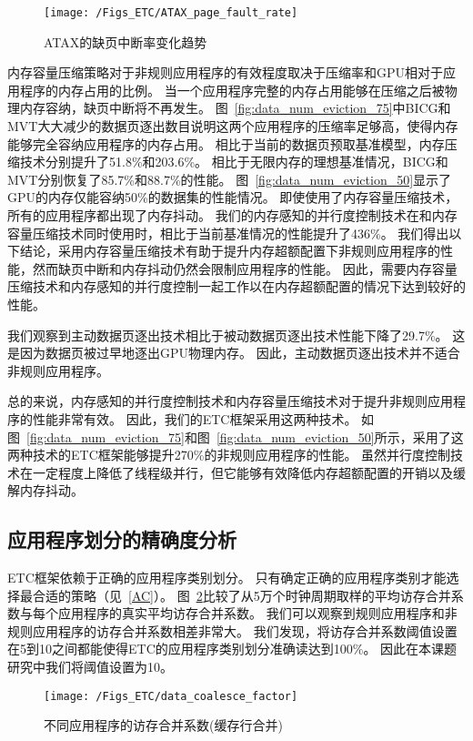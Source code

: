 \begin{figure}[htbp] %
  \centering
  \texttt{[image: /Figs\_ETC/ATAX\_page\_fault\_rate]}
  \caption{ATAX的缺页中断率变化趋势}
  \label{fig:ATAX_page_fault_rate}
\end{figure}


内存容量压缩策略对于非规则应用程序的有效程度取决于压缩率和GPU相对于应用程序的内存占用的比例。
当一个应用程序完整的内存占用能够在压缩之后被物理内存容纳，缺页中断将不再发生。
图~\ref{fig:data_num_eviction_75}中BICG和MVT大大减少的数据页逐出数目说明这两个应用程序的压缩率足够高，使得内存能够完全容纳应用程序的内存占用。
相比于当前的数据页预取基准模型，内存压缩技术分别提升了51.8\%和203.6\%。
相比于无限内存的理想基准情况，BICG和MVT分别恢复了85.7\%和88.7\%的性能。
图~\ref{fig:data_num_eviction_50}显示了GPU的内存仅能容纳50\%的数据集的性能情况。
即使使用了内存容量压缩技术，所有的应用程序都出现了内存抖动。
我们的内存感知的并行度控制技术在和内存容量压缩技术同时使用时，相比于当前基准情况的性能提升了436\%。
我们得出以下结论，采用内存容量压缩技术有助于提升内存超额配置下非规则应用程序的性能，然而缺页中断和内存抖动仍然会限制应用程序的性能。
因此，需要内存容量压缩技术和内存感知的并行度控制一起工作以在内存超额配置的情况下达到较好的性能。

我们观察到主动数据页逐出技术相比于被动数据页逐出技术性能下降了29.7\%。
这是因为数据页被过早地逐出GPU物理内存。
因此，主动数据页逐出技术并不适合非规则应用程序。

总的来说，内存感知的并行度控制技术和内存容量压缩技术对于提升非规则应用程序的性能非常有效。
因此，我们的ETC框架采用这两种技术。
如图~\ref{fig:data_num_eviction_75}和图~\ref{fig:data_num_eviction_50}所示，采用了这两种技术的ETC框架能够提升270\%的非规则应用程序的性能。
虽然并行度控制技术在一定程度上降低了线程级并行，但它能够有效降低内存超额配置的开销以及缓解内存抖动。

\subsection{应用程序划分的精确度分析}
ETC框架依赖于正确的应用程序类别划分。
只有确定正确的应用程序类别才能选择最合适的策略（见~\ref{AC}）。
图~\ref{fig:data_coalesce_factor}比较了从5万个时钟周期取样的平均访存合并系数与每个应用程序的真实平均访存合并系数。
我们可以观察到规则应用程序和非规则应用程序的访存合并系数相差非常大。
我们发现，将访存合并系数阈值设置在5到10之间都能使得ETC的应用程序类别划分准确读达到100\%。
因此在本课题研究中我们将阈值设置为10。

\begin{figure}[htbp] %
  \centering
  \texttt{[image: /Figs\_ETC/data\_coalesce\_factor]}
  \caption{不同应用程序的访存合并系数(缓存行合并)}
  \label{fig:data_coalesce_factor}
\end{figure}


